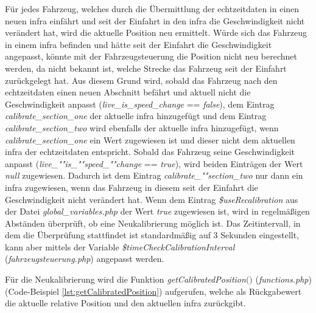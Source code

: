 Für jedes Fahrzeug, welches durch die Übermittlung der \Gls{echtzeitdaten} in einen neuen \ac{infra} einfährt und seit der Einfahrt in den \ac{infra} die Geschwindigkeit nicht verändert hat, wird die aktuelle Position neu ermittelt. Würde sich das Fahrzeug in einem \ac{infra} befinden und hätte seit der Einfahrt die Geschwindigkeit angepasst, könnte mit der Fahrzeugsteuerung die Position nicht neu berechnet werden, da nicht bekannt ist, welche Strecke das Fahrzeug seit der Einfahrt zurückgelegt hat. Aus diesem Grund wird, sobald das Fahrzeug nach den \Gls{echtzeitdaten} einen neuen Abschnitt befährt und aktuell nicht die Geschwindigkeit anpasst (\textit{live\_is\_speed\_change} == \textit{false}), dem Eintrag \textit{calibrate\_section\_one} der aktuelle \ac{infra} hinzugefügt und dem Eintrag \textit{calibrate\_section\_two} wird ebenfalls der aktuelle \ac{infra} hinzugefügt, wenn \textit{calibrate\_section\_one} ein Wert zugewiesen ist und dieser nicht dem aktuellen \ac{infra} der \Gls{echtzeitdaten} entspricht. Sobald das Fahrzeug seine Geschwindigkeit anpasst (\textit{live\_""is\_""speed\_""change} == \textit{true}), wird beiden Einträgen der Wert \textit{null} zugewiesen. Dadurch ist dem Eintrag \textit{ca\-li\-brate\_""sec\-tion\_two} nur dann ein \ac{infra} zugewiesen, wenn das Fahrzeug in diesem seit der Einfahrt die Geschwindigkeit nicht verändert hat. Wenn dem Eintrag \textit{\$useRecalibration} aus der Datei \textit{global\_variables.php} der Wert \textit{true} zugewiesen ist, wird in regelmäßigen Abständen überprüft, ob eine Neukalibrierung möglich ist. Das Zeitintervall, in dem die Überprüfung stattfindet ist standardmäßig auf 3 Sekunden eingestellt, kann aber mittels der Variable \textit{\$timeCheckCalibrationInterval} (\textit{fahrzeugsteuerung.php}) angepasst werden.

Für die Neukalibrierung wird die Funktion \textit{getCalibratedPosition$($$)$} (\textit{functions.php}) (Code-Beispiel \ref{lst:getCalibratedPosition}) aufgerufen, welche als Rückgabewert die aktuelle relative Position und den aktuellen \ac{infra} zurückgibt.

